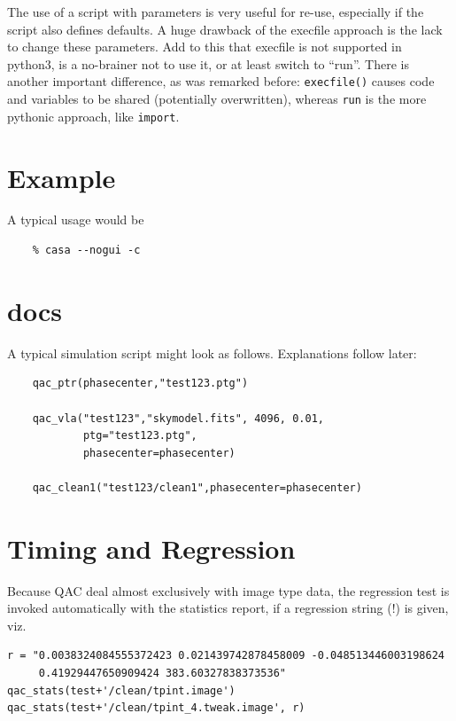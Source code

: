 \documentclass[11pt,twoside]{article}
\begin{document}
The use of a script with parameters is very useful for re-use, especially if the script also defines defaults. A huge
drawback of the execfile approach is the lack to change these parameters. Add to this that execfile is not supported
in python3, is a no-brainer not to use it, or at least switch to ``run''. There is another important difference,
as was remarked before:  {\tt execfile()} causes code and variables to be shared (potentially overwritten), whereas
{\tt run} is the more pythonic approach, like {\tt import}.


\section{Example}

A typical usage would be

\begin{verbatim}
    % casa --nogui -c 
\end{verbatim}


\section{docs}

A typical simulation script might look as follows. Explanations follow later:

\footnotesize
\begin{verbatim}
    qac_ptr(phasecenter,"test123.ptg")

    qac_vla("test123","skymodel.fits", 4096, 0.01,
            ptg="test123.ptg",
            phasecenter=phasecenter)

    qac_clean1("test123/clean1",phasecenter=phasecenter)
\end{verbatim}
\normalsize

\section{Timing and Regression}

Because QAC deal almost exclusively with image type data, the regression test is invoked automatically
with the statistics report, if a regression string (!) is given, viz.

\footnotesize
\begin{verbatim}
r = "0.0038324084555372423 0.021439742878458009 -0.048513446003198624
     0.41929447650909424 383.60327838373536"
qac_stats(test+'/clean/tpint.image')
qac_stats(test+'/clean/tpint_4.tweak.image', r)
\end{verbatim}
\normalsize
\end{document}
